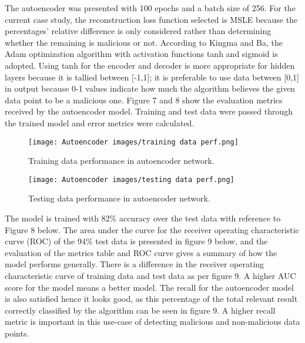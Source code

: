 \documentclass[journal]{IEEEtran}
\begin{document}
The autoencoder was presented with 100 epochs and a batch size of 256. For the current case study, the reconstruction loss function selected is MSLE because the percentages’ relative difference is only considered rather than determining whether the remaining is malicious or not. According to Kingma and Ba, the Adam optimization algorithm with activation functions tanh and sigmoid is adopted. Using tanh for the encoder and decoder is more appropriate for hidden layers because it is tallied between [-1,1]; it is preferable to use data between [0,1] in output because 0-1 values indicate how much the algorithm believes the given data point to be a malicious one. Figure 7 and 8 show the evaluation metrics received by the autoencoder model. Training and test data were passed through the trained model and error metrics were calculated.

\begin{figure}[h!] %
    \centering
    \texttt{[image: Autoencoder images/training data perf.png]}  %
    \caption{Training data performance in autoencoder network.}
    \label{fig:autoencoder-structure}
\end{figure}

\begin{figure}[h!] %
    \centering
    \texttt{[image: Autoencoder images/testing data perf.png]}  %
    \caption{Testing data performance in autoencoder network.}
    \label{fig:autoencoder-structure}
\end{figure}

The model is trained with 82\% accuracy over the test data with reference to Figure 8 below. The area under the curve for the receiver operating characteristic curve (ROC) of the 94\% test data is presented in figure 9 below, and the evaluation of the metrics table and ROC curve gives a summary of how the model performs generally. There is a difference in the receiver operating characteristic curve of training data and test data as per figure 9. A higher AUC score for the model means a better model. The recall for the autoencoder model is also satisfied hence it looks good, as this percentage of the total relevant result correctly classified by the algorithm can be seen in figure 9. A higher recall metric is important in this use-case of detecting malicious and non-malicious data points.
\end{document}
